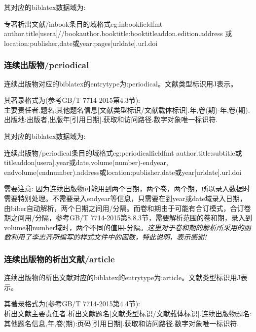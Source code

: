 \documentclass[11pt]{article} %
\begin{document}
其对应的biblatex数据域为:
\begin{codetex}{专著析出文献/inbook条目的域格式}{eg:inbookfieldfmt}
author.title[usera]//bookauthor.booktitle:booktitleaddon.edition.address 或location:publisher,date或year:pages[urldate].url.doi
\end{codetex}

\subsubsection{连续出版物/periodical}
\begin{refentry}{}{}
连续出版物对应的biblatex的entrytype为:periodical。文献类型标识用J表示。

其著录格式为(参考GB/T 7714-2015第4.3节):\\
主要责任者.题名:其他题名信息[文献类型标识/文献载体标识].年,卷(期)-年,卷(期).出版地:出版者,出版年[引用日期].获取和访问路径.数字对象唯一标识符.
\end{refentry}

其对应的biblatex数据域为:
\begin{codetex}{连续出版物/periodical条目的域格式}{eg:periodicalfieldfmt}
author.title:subtitle或titleaddon[usera].year或date,volume(number)-endyear, endvolume(endnumber).address或location:publisher,date或year[urldate].url.doi
\end{codetex}

需要注意: 因为连续出版物可能用到两个日期，两个卷，两个期，所以录入数据时需要特别处理。不需要录入endyear等信息，只需要在到year或date域录入日期，由biber自动解析，两个日期之间用/分隔。而卷和期由于可能有合订模式，合订卷期之间用/分隔，参考GB/T 7714-2015第8.8.3节，需要解析范围的卷和期，录入到volume和number域时，两个不同的值用-分隔。\emph{这里对于卷和期的解析所采用的函数利用了李志齐所编写的样式文件中的函数，特此说明，表示感谢!}

\subsubsection{连续出版物的析出文献/article}
\begin{refentry}{}{}
连续出版物的析出文献对应的biblatex的entrytype为:article。文献类型标识用J表示。

其著录格式为(参考GB/T 7714-2015第4.4节):\\
析出文献主要责任者.析出文献题名[文献类型标识/文献载体标识].连续出版物题名:其他题名信息,年,卷(期):页码[引用日期].获取和访问路径.数字对象唯一标识符.
\end{refentry}
\end{document}
